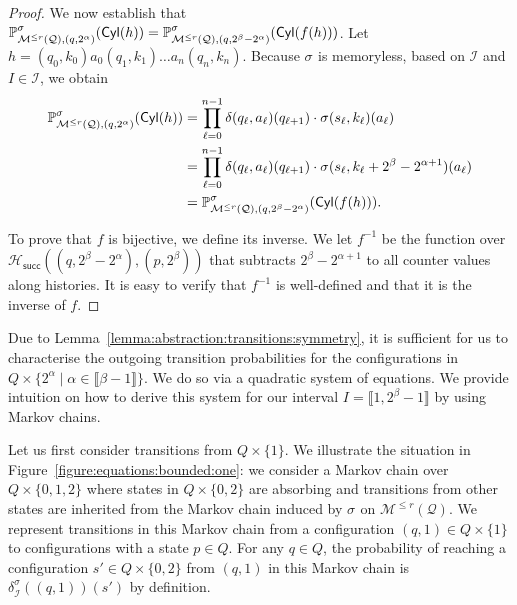 \documentclass[a4paper,UKenglish,cleveref,autoref,thm-restate,colorlinks]{lipics-v2021}
\newcommand{\integerInterval}[1]{\llbracket{}#1\rrbracket{}}
\newcommand{\cyl}[1]{\mathsf{Cyl}(#1)}
\newcommand{\mdp}{\mathcal{M}}
\newcommand{\mdpTrans}{\delta}
\newcommand{\histPart}{\mathcal{H}}
\newcommand{\hist}{h}
\newcommand{\indexPosition}{\ell}
\newcommand{\indexLast}{n}
\newcommand{\ocmdp}{\mathcal{Q}}
\newcommand{\ocmdpFin}[2]{\mdp^{\leq #2}(#1)}
\newcommand{\ocStateSpace}{Q}
\newcommand{\ocState}{q}
\newcommand{\ocStateB}{p}
\newcommand{\ocCount}{k}
\newcommand{\ocConfig}{s}
\newcommand{\ocAction}{a}
\newcommand{\ocTrans}{\delta}
\newcommand{\counterUB}{r}
\newcommand{\intPart}{\mathcal{I}}
\newcommand{\interval}{I}
\newcommand{\powerIndex}{\alpha}
\newcommand{\powerMax}{\beta}
\newcommand{\compressChainTransTemplate}[2]{\mdpTrans^{#1}_{#2}}
\newcommand{\compressChainTrans}{\compressChainTransTemplate{\strat}{\intPart}}
\newcommand{\succHist}[2]{\histPart_{\mathsf{succ}}(#1, #2)}
\newcommand{\stratGeneric}[1]{{\sigma_{#1}}}
\newcommand{\strat}{\stratGeneric{}}
\begin{document}
\begin{proof}
  We now establish that $\probaGverb{\ocmdpFin{\ocmdp}{\counterUB}}{(\ocState, 2^\powerIndex)}{\strat}(\cyl{\hist})=\probaGverb{\ocmdpFin{\ocmdp}{\counterUB}}{(\ocState, 2^\powerMax-2^\powerIndex)}{\strat}(\cyl{f(\hist)})$.
  Let $\hist = (\ocState_0, \ocCount_0)\ocAction_0(\ocState_1, \ocCount_1)\ldots\ocAction_\indexLast(\ocState_\indexLast, \ocCount_\indexLast)$.
  Because $\strat$ is memoryless, based on $\intPart$ and $\interval\in\intPart$, we obtain
  \begin{align*}
    \probaGverb{\ocmdpFin{\ocmdp}{\counterUB}}{(\ocState, 2^\powerIndex)}{\strat}(\cyl{\hist})
    & = \prod_{\indexPosition=0}^{\indexLast-1}
      \ocTrans(\ocState_\indexPosition, \ocAction_\indexPosition)(\ocState_{\indexPosition+1})\cdot
      \strat(\ocConfig_\indexPosition, \ocCount_\indexPosition)(\ocAction_\indexPosition) \\
    & = \prod_{\indexPosition=0}^{\indexLast-1}
      \ocTrans(\ocState_\indexPosition, \ocAction_\indexPosition)(\ocState_{\indexPosition+1})\cdot
    \strat(\ocConfig_\indexPosition, \ocCount_\indexPosition+2^\powerMax-2^{\powerIndex+1})(\ocAction_\indexPosition) \\
    & =\probaGverb{\ocmdpFin{\ocmdp}{\counterUB}}{(\ocState, 2^\powerMax-2^\powerIndex)}{\strat}(\cyl{f(\hist)}).
  \end{align*}

  To prove that $f$ is bijective, we define its inverse.
  We let $f^{-1}$ be the function over $\succHist{(\ocState, 2^\powerMax-2^\powerIndex)}{(\ocStateB, 2^\powerMax)}$ that subtracts $2^\powerMax-2^{\powerIndex+1}$ to all counter values along histories.
  It is easy to verify that $f^{-1}$ is well-defined and that it is the inverse of $f$.
\end{proof}

Due to Lemma~\ref{lemma:abstraction:transitions:symmetry}, it is sufficient for us to characterise the outgoing transition probabilities for the configurations in $\ocStateSpace\times\{2^{\powerIndex} \mid \powerIndex\in\integerInterval{\powerMax-1}\}$.
We do so via a quadratic system of equations.
We provide intuition on how to derive this system for our interval $\interval=\integerInterval{1, 2^\powerMax-1}$ by using Markov chains. 

Let us first consider transitions from $\ocStateSpace\times\{1\}$. We illustrate the situation in Figure~\ref{figure:equations:bounded:one}: we consider a Markov chain over $\ocStateSpace\times\{0, 1, 2\}$ where states in $\ocStateSpace\times\{0, 2\}$ are absorbing and transitions from other states are inherited from the Markov chain induced by $\strat$ on $\ocmdpFin{\ocmdp}{\counterUB}$.
We represent transitions in this Markov chain from a configuration $(\ocState, 1)\in\ocStateSpace\times\{1\}$ to configurations with a state $\ocStateB\in\ocStateSpace$.
For any $\ocState\in\ocStateSpace$, the probability of reaching a configuration $\ocConfig'\in\ocStateSpace\times\{0, 2\}$ from $(\ocState, 1)$ in this Markov chain is $\compressChainTrans((\ocState, 1))(\ocConfig')$ by definition.
\end{document}
